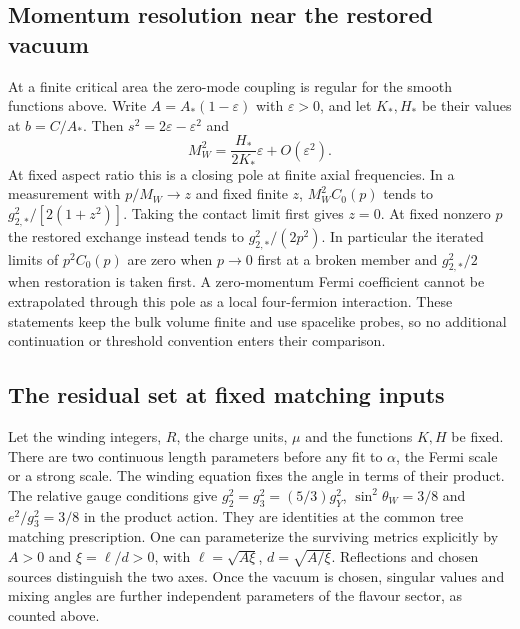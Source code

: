 \documentclass[aps,prd,reprint,onecolumn,nofootinbib,amsmath,amssymb]{revtex4-2}
\begin{document}
\subsection{Momentum resolution near the restored vacuum}
At a finite critical area the zero-mode coupling is regular for the smooth functions above. Write $A=A_*(1-\varepsilon)$ with $\varepsilon>0$, and let $K_*,H_*$ be their values at $b=C/A_*$. Then $s^2=2\varepsilon-\varepsilon^2$ and
\begin{equation}
 M_W^2=\frac{H_*}{2K_*}\varepsilon+O(\varepsilon^2).
\end{equation}
At fixed aspect ratio this is a closing pole at finite axial frequencies. In a measurement with $p/M_W\to z$ and fixed finite $z$, $M_W^2 C_0(p)$ tends to $g_{2,*}^2/[2(1+z^2)]$. Taking the contact limit first gives $z=0$. At fixed nonzero $p$ the restored exchange instead tends to $g_{2,*}^2/(2p^2)$. In particular the iterated limits of $p^2 C_0(p)$ are zero when $p\to0$ first at a broken member and $g_{2,*}^2/2$ when restoration is taken first. A zero-momentum Fermi coefficient cannot be extrapolated through this pole as a local four-fermion interaction. These statements keep the bulk volume finite and use spacelike probes, so no additional continuation or threshold convention enters their comparison.

\subsection{The residual set at fixed matching inputs}
Let the winding integers, $R$, the charge units, $\mu$ and the functions $K,H$ be fixed. There are two continuous length parameters before any fit to $\alpha$, the Fermi scale or a strong scale. The winding equation fixes the angle in terms of their product. The relative gauge conditions give $g_2^2=g_3^2=(5/3)g_Y^2$, $\sin^2\theta_W=3/8$ and $e^2/g_3^2=3/8$ in the product action. They are identities at the common tree matching prescription. One can parameterize the surviving metrics explicitly by $A>0$ and $\xi=\ell/d>0$, with $\ell=\sqrt{A\xi}$, $d=\sqrt{A/\xi}$. Reflections and chosen sources distinguish the two axes. Once the vacuum is chosen, singular values and mixing angles are further independent parameters of the flavour sector, as counted above.
\end{document}
